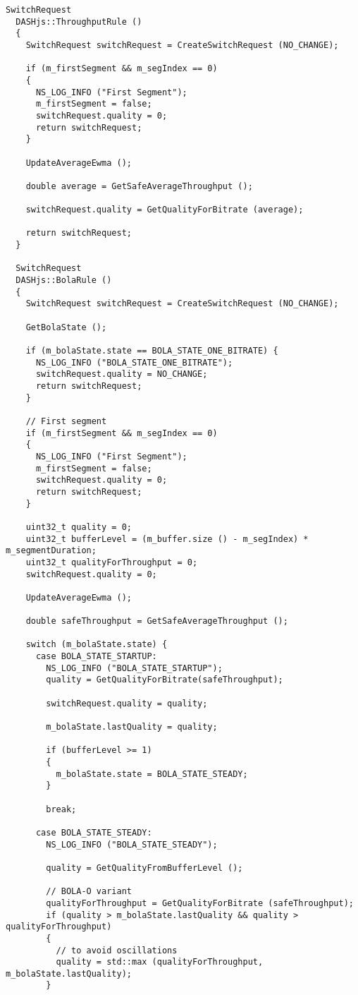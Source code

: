 \begin{lstlisting}[language=myC++, caption={DASHjs.cc}, captionpos=b]
  SwitchRequest
  DASHjs::ThroughputRule ()
  {
    SwitchRequest switchRequest = CreateSwitchRequest (NO_CHANGE);
  
    if (m_firstSegment && m_segIndex == 0)
    {
      NS_LOG_INFO ("First Segment");
      m_firstSegment = false;
      switchRequest.quality = 0;
      return switchRequest;
    }
  
    UpdateAverageEwma ();
  
    double average = GetSafeAverageThroughput ();
  
    switchRequest.quality = GetQualityForBitrate (average);
  
    return switchRequest;
  }
  
  SwitchRequest
  DASHjs::BolaRule ()
  {
    SwitchRequest switchRequest = CreateSwitchRequest (NO_CHANGE);
  
    GetBolaState ();
  
    if (m_bolaState.state == BOLA_STATE_ONE_BITRATE) {
      NS_LOG_INFO ("BOLA_STATE_ONE_BITRATE");
      switchRequest.quality = NO_CHANGE;
      return switchRequest;
    }
  
    // First segment
    if (m_firstSegment && m_segIndex == 0)
    {
      NS_LOG_INFO ("First Segment");
      m_firstSegment = false;
      switchRequest.quality = 0;
      return switchRequest;
    }
  
    uint32_t quality = 0;
    uint32_t bufferLevel = (m_buffer.size () - m_segIndex) * m_segmentDuration;
    uint32_t qualityForThroughput = 0;
    switchRequest.quality = 0;
  
    UpdateAverageEwma ();
  
    double safeThroughput = GetSafeAverageThroughput ();
  
    switch (m_bolaState.state) {
      case BOLA_STATE_STARTUP:
        NS_LOG_INFO ("BOLA_STATE_STARTUP");
        quality = GetQualityForBitrate(safeThroughput);
  
        switchRequest.quality = quality;
  
        m_bolaState.lastQuality = quality;
  
        if (bufferLevel >= 1)
        {
          m_bolaState.state = BOLA_STATE_STEADY;
        }
  
        break;
  
      case BOLA_STATE_STEADY:
        NS_LOG_INFO ("BOLA_STATE_STEADY");
  
        quality = GetQualityFromBufferLevel ();
  
        // BOLA-O variant
        qualityForThroughput = GetQualityForBitrate (safeThroughput);
        if (quality > m_bolaState.lastQuality && quality > qualityForThroughput)
        {
          // to avoid oscillations
          quality = std::max (qualityForThroughput, m_bolaState.lastQuality);
        }


\end{lstlisting}
